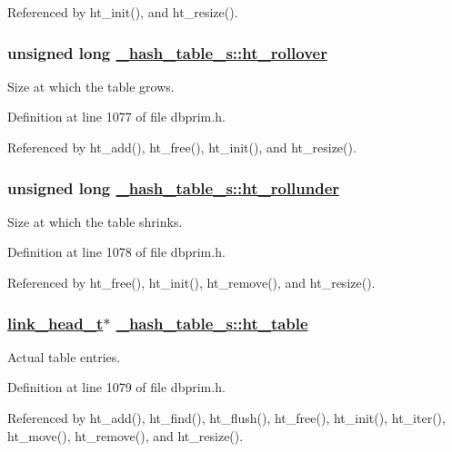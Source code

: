 Referenced by ht\_\-init(), and ht\_\-resize().\hypertarget{struct__hash__table__s_o4}{
\subsubsection[ht\_\-rollover]{\setlength{\rightskip}{0pt plus 5cm}unsigned long \hyperlink{struct__hash__table__s_o4}{\_\-hash\_\-table\_\-s::ht\_\-rollover}}}
\label{struct__hash__table__s_o4}


Size at which the table grows. 

Definition at line 1077 of file dbprim.h.

Referenced by ht\_\-add(), ht\_\-free(), ht\_\-init(), and ht\_\-resize().\hypertarget{struct__hash__table__s_o5}{
\subsubsection[ht\_\-rollunder]{\setlength{\rightskip}{0pt plus 5cm}unsigned long \hyperlink{struct__hash__table__s_o5}{\_\-hash\_\-table\_\-s::ht\_\-rollunder}}}
\label{struct__hash__table__s_o5}


Size at which the table shrinks. 

Definition at line 1078 of file dbprim.h.

Referenced by ht\_\-free(), ht\_\-init(), ht\_\-remove(), and ht\_\-resize().\hypertarget{struct__hash__table__s_o6}{
\subsubsection[ht\_\-table]{\setlength{\rightskip}{0pt plus 5cm}\hyperlink{struct__link__head__s}{link\_\-head\_\-t}$\ast$ \hyperlink{struct__hash__table__s_o6}{\_\-hash\_\-table\_\-s::ht\_\-table}}}
\label{struct__hash__table__s_o6}


Actual table entries. 

Definition at line 1079 of file dbprim.h.

Referenced by ht\_\-add(), ht\_\-find(), ht\_\-flush(), ht\_\-free(), ht\_\-init(), ht\_\-iter(), ht\_\-move(), ht\_\-remove(), and ht\_\-resize().